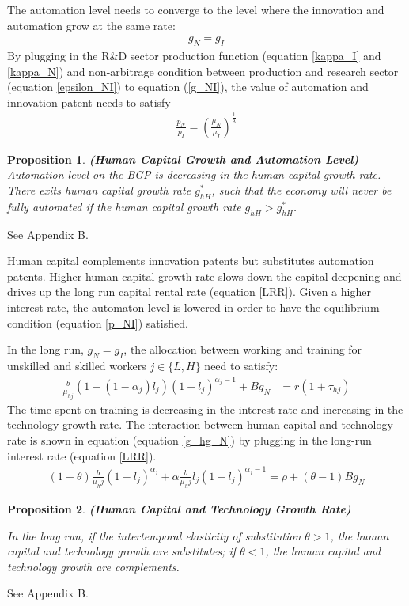\documentclass[12pt]{article}
\newtheorem{proposition}{Proposition}
\begin{document}
The automation level needs to converge to the level where the innovation and automation grow at the same rate: 
\begin{align}
\label{g_NI}
g_N = g_I 
\end{align}
By plugging in the R\&D sector production function (equation \ref{kappa_I} and \ref{kappa_N}) and non-arbitrage condition between production and research sector (equation \ref{epsilon_NI}) to equation (\ref{g_NI}), the value of automation and innovation patent needs to satisfy
\begin{align}
\label{p_NI}
\frac{p_N}{p_I} = (\frac{\mu_N}{\mu_I})^{\frac{1}{\lambda}}
\end{align}
\begin{proposition}{\bf (Human Capital Growth and Automation Level)} \\

Automation level on the BGP is decreasing in the human capital growth rate. There exits human capital growth rate $g_{hH}^*$, such that the economy will never be fully automated if the human capital growth rate $g_{hH}>g_{hH}^*$. 
\end{proposition}
 See Appendix B.

Human capital complements innovation patents but substitutes automation patents. Higher human capital growth rate slows down the capital deepening and drives up the long run capital rental rate (equation \ref{LRR}). Given a higher interest rate, the automaton level is lowered in order to have the equilibrium condition (equation \ref{p_NI}) satisfied.

In the long run, $g_N = g_I$, the allocation between working and training for unskilled and skilled workers $j\in\{L,H\}$ need to satisfy:
\begin{align*}
\frac{b}{\mu_{hj}}(1-(1-\alpha_j)l_j)(1-l_j)^{\alpha_j-1}+Bg_N&= r(1+\tau_{hj}) 
\end{align*}
The time spent on training is decreasing in the interest rate and increasing in the technology growth rate. The interaction between human capital and technology rate is shown in equation (equation \ref{g_hg_N}) by plugging in the long-run interest rate (equation \ref{LRR}). 
\begin{align} 
\label{g_hg_N}
(1-\theta)\frac{b}{\mu_hj}(1-l_j)^{\alpha_j}+\alpha\frac{b}{\mu_hj}l_j(1-l_j)^{\alpha_j-1} = \rho+(\theta-1)Bg_N
\end{align}

\begin{proposition}{\bf (Human Capital and Technology Growth Rate)}

In the long run, if the intertemporal elasticity of substitution $\theta>1$, the human capital and technology growth are substitutes; if $\theta<1$, the human capital and technology growth are complements.
\end{proposition}
 See Appendix B.
\end{document}
